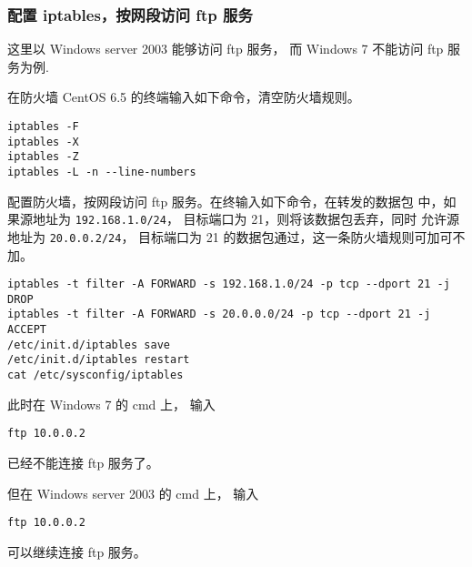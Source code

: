 \subsubsection{配置 iptables，按网段访问 ftp 服务}
这里以 Windows server 2003 能够访问 ftp 服务，
而 Windows 7 不能访问 ftp 服务为例.

在防火墙 CentOS 6.5 的终端输入如下命令，清空防火墙规则。
\begin{verbatim}
iptables -F
iptables -X
iptables -Z
iptables -L -n --line-numbers
\end{verbatim}

配置防火墙，按网段访问 ftp 服务。在终输入如下命令，在转发的数据包
中，如果源地址为 \texttt{192.168.1.0/24}，
目标端口为 21，则将该数据包丢弃，同时
允许源地址为 \texttt{20.0.0.2/24}，
目标端口为 21 的数据包通过，这一条防火墙规则可加可不加。
\begin{verbatim}
iptables -t filter -A FORWARD -s 192.168.1.0/24 -p tcp --dport 21 -j DROP
iptables -t filter -A FORWARD -s 20.0.0.0/24 -p tcp --dport 21 -j ACCEPT
/etc/init.d/iptables save
/etc/init.d/iptables restart
cat /etc/sysconfig/iptables
\end{verbatim}

此时在 Windows 7 的 cmd 上，
输入
\begin{verbatim}
ftp 10.0.0.2
\end{verbatim}
已经不能连接 ftp 服务了。

但在 Windows server 2003 的 cmd 上，
输入
\begin{verbatim}
ftp 10.0.0.2
\end{verbatim}
可以继续连接 ftp 服务。
%
